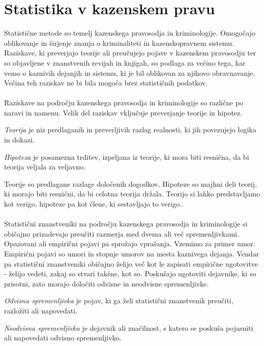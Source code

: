 \documentclass[fin1, tisk]{fmfdelo}
\theoremstyle{definition} %
\theoremstyle{trditev} %
\theoremstyle{izrek}
\begin{document}
\section{Statistika v kazenskem pravu}
Statistične metode so temelj kazenskega pravosodja in kriminologije. Omogočajo oblikovanje in širjenje znanja o kriminaliteti in kazenskopravnem 
sistemu. Raziskave, ki preverjajo teorije ali preučujejo pojave v kazenskem pravosodju ter so objavljene v znanstvenih revijah in knjigah, so 
podlaga za večino tega, kar vemo o kaznivih dejanjih in sistemu, ki je bil oblikovan za njihovo obravnavanje. Večina teh raziskav ne bi bila mogoča 
brez statističnih podatkov.\\\\
Raziskave na področju kazenskega pravosodja in kriminologije so različne po naravi in namenu. Velik del raziskav vključuje preverjanje teorije 
in hipotez. 
\begin{definicija}
    \textit{Teorija} je niz predlaganih in preverljivih razlag realnosti, ki jih povezujejo logika in dokazi.
\end{definicija}
\begin{definicija}
    \textit{Hipoteza} je posamezna trditev, izpeljana iz teorije, ki mora biti resnična, da bi teorija veljala za veljavno.
\end{definicija}
Teorije so predlagane razlage določenih dogodkov. Hipoteze so majhni deli teorij, ki morajo biti resnični, da bi celotna teorija držala. Teorijo 
si lahko predstavljamo kot verigo, hipoteze pa kot člene, ki sestavljajo to verigo.\\\\
Statistični znanstveniki na področju kazenskega pravosodja in kriminologije si običajno prizadevajo preučiti razmerja med dvema ali več spremenljivkami. 
Opazovani ali empirični pojavi pa sprožajo vprašanja. Vzemimo za primer umor. Empirični pojavi so umori in stopnje umorov na mesta kaznivega 
dejanja. Vendar pa statistični znanstveniki običajno želijo več kot le zapisati empirične ugotovitve - želijo vedeti, zakaj so stvari takšne, kot so. 
Poskušajo ugotoviti dejavnike, ki so prisotni, zato morajo določiti odvisne in neodvisne spremenljivke.
\begin{definicija}
    \textit{Odvisna spremenljivka} je pojav, ki ga želi statistični znanstvenik preučiti, razložiti ali napovedati.
\end{definicija}
\begin{definicija}
    \textit{Neodvisna spremenljivka} je dejavnik ali značilnost, s katero se poskuša pojasniti ali napovedati odvisno spremenljivko.
\end{definicija}
\end{document}
